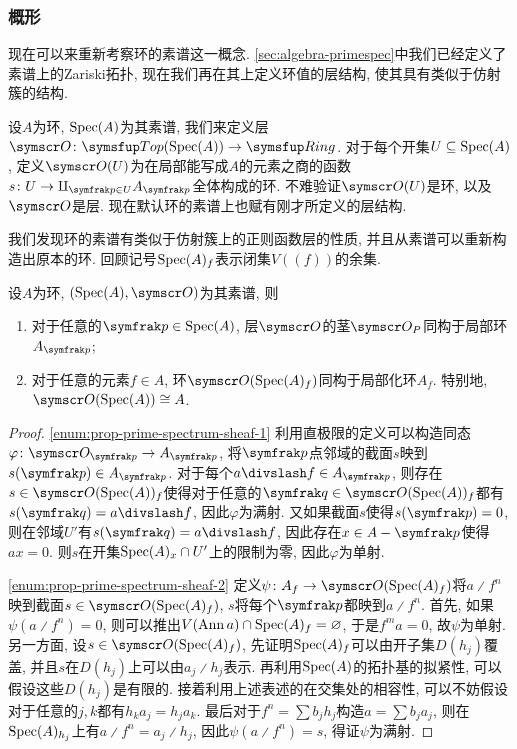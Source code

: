 \subsubsection{概形}

现在可以来重新考察环的素谱这一概念. \ref{sec:algebra-primespec}中我们已经定义了素谱上的Zariski拓扑, 现在我们再在其上定义环值的层结构, 使其具有类似于仿射簇的结构.

设$A$为环, $\operatorname{Spec} (A)$为其素谱, 我们来定义层$\sheaf{O}\colon \cat{Top}(\Spec (A))\to \cat{Ring}$. 对于每个开集$U\subseteq \operatorname{Spec} (A)$, 定义$\sheaf{O}(U)$为在局部能写成$A$的元素之商的函数$s\colon U\to \amalg_{\ideal{p}\in U}A_{\ideal{p}}$全体构成的环. 不难验证$\sheaf{O}(U)$是环, 以及$\sheaf{O}$是层. 现在默认环的素谱上也赋有刚才所定义的层结构.

我们发现环的素谱有类似于仿射簇上的正则函数层的性质, 并且从素谱可以重新构造出原本的环. 回顾记号$\operatorname{Spec}(A)_{f}$表示闭集$V((f))$的余集.

\begin{proposition}\label{prop:primespectrumsheaf}
  设$A$为环, $(\Spec (A), \OO)$为其素谱, 则
  \begin{enumerate}
    \item\label{enum:prop-prime-spectrum-sheaf-1} 对于任意的$\ideal{p}\in\Spec (A)$, 层$\OO$的茎$\OO_P$同构于局部环$A_{\ideal{p}}$;
    \item\label{enum:prop-prime-spectrum-sheaf-2} 对于任意的元素$f\in A$, 环$\OO(\Spec (A)_f)$同构于局部化环$A_f$. 特别地, $\OO (\Spec (A))\cong A$.
  \end{enumerate}
\end{proposition}

\begin{proof}
  \ref{enum:prop-prime-spectrum-sheaf-1} 利用直极限的定义可以构造同态$\varphi\colon \OO_{\ideal{p}}\to A_{\ideal{p}}$, 将$\ideal{p}$点邻域的截面$s$映到$s(\ideal{p})\in A_{\ideal{p}}$. 对于每个$a{\divslash}f\in A_{\ideal{p}}$, 则存在$s\in\OO (\Spec (A))_f$使得对于任意的$\ideal{q}\in \OO (\Spec (A))_f$都有$s(\ideal{q})=a{\divslash}f$, 因此$\varphi$为满射. 又如果截面$s$使得$s(\ideal{p})=0$, 则在邻域$U'$有$s(\ideal{q})=a{\divslash}f$, 因此存在$x\in A-\ideal{p}$使得$ax=0$. 则$s$在开集$\operatorname{Spec} (A)_x\cap U'$上的限制为零, 因此$\varphi$为单射.

  \ref{enum:prop-prime-spectrum-sheaf-2} 定义$\psi\colon A_f\to \OO (\Spec (A)_f)$将$a{\divslash}f^n$映到截面$s\in \OO (\Spec (A)_f)$, $s$将每个$\ideal{p}$都映到$a{\divslash}f^n$. 首先, 如果$\psi(a{\divslash}f^n)=0$, 则可以推出$V(\operatorname{Ann} a)\cap \operatorname{Spec} (A)_f=\varnothing$, 于是$f^ma=0$, 故$\psi$为单射. 另一方面, 设$s\in \OO (\Spec (A)_f)$, 先证明$\operatorname{Spec} (A)_f$可以由开子集$D(h_j)$覆盖, 并且$s$在$D(h_j)$上可以由$a_j{\divslash}h_j$表示. 再利用$\operatorname{Spec} (A)$的拓扑基的拟紧性, 可以假设这些$D(h_j)$是有限的. 接着利用上述表述的在交集处的相容性, 可以不妨假设对于任意的$j,k$都有$h_ka_j=h_ja_k$. 最后对于$f^n=\sum b_jh_j$构造$a=\sum b_ja_j$, 则在$\operatorname{Spec} (A)_{h_j}$上有$a{\divslash}f^n=a_j{\divslash}h_j$, 因此$\psi (a{\divslash}f^n)=s$, 得证$\psi$为满射.
\end{proof}


